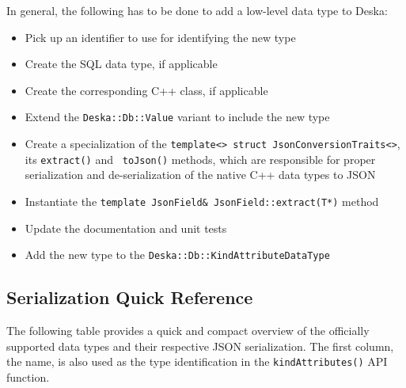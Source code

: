 \documentclass{article}
\begin{document}
In general, the following has to be done to add a low-level data type to Deska:

\begin{itemize}
    \item Pick up an identifier to use for identifying the new type
    \item Create the SQL data type, if applicable
    \item Create the corresponding C++ class, if applicable
    \item Extend the {\tt Deska::Db::Value} variant to include the new type
    \item Create a specialization of the {\tt template<> struct JsonConversionTraits<>}, its {\tt extract()} and {\tt
        toJson()} methods, which are responsible for proper serialization and de-serialization of the native C++ data
        types to JSON
    \item Instantiate the {\tt template JsonField\& JsonField::extract(T*)} method
    \item Update the documentation and unit tests
    \item Add the new type to the {\tt Deska::Db::KindAttributeDataType}
\end{itemize}

\subsection{Serialization Quick Reference}
\label{sec:json-data-types-reference}

The following table provides a quick and compact overview of the officially supported data types and their respective
JSON serialization.  The first column, the name, is also used as the type identification in the {\tt kindAttributes()}
API function.
\end{document}
